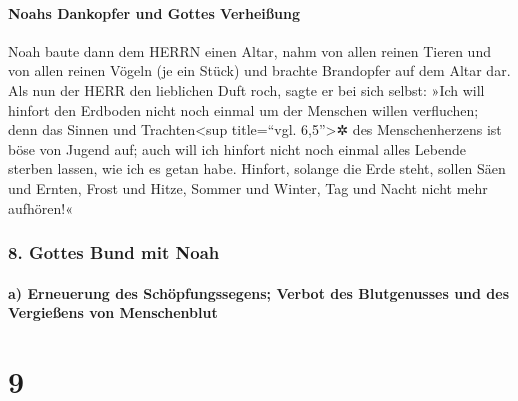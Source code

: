 \hypertarget{noahs-dankopfer-und-gottes-verheiuxdfung}{%
\paragraph{Noahs Dankopfer und Gottes
Verheißung}\label{noahs-dankopfer-und-gottes-verheiuxdfung}}

 Noah baute dann dem HERRN einen Altar, nahm von allen
reinen Tieren und von allen reinen Vögeln (je ein Stück) und brachte
Brandopfer auf dem Altar dar.  Als nun der HERR den
lieblichen Duft roch, sagte er bei sich selbst: »Ich will hinfort den
Erdboden nicht noch einmal um der Menschen willen verfluchen; denn das
Sinnen und Trachten\textless sup title=``vgl. 6,5''\textgreater✲ des
Menschenherzens ist böse von Jugend auf; auch will ich hinfort nicht
noch einmal alles Lebende sterben lassen, wie ich es getan habe.
 Hinfort, solange die Erde steht, sollen Säen und Ernten,
Frost und Hitze, Sommer und Winter, Tag und Nacht nicht mehr aufhören!«

\hypertarget{gottes-bund-mit-noah}{%
\subsubsection{8. Gottes Bund mit Noah}\label{gottes-bund-mit-noah}}

\hypertarget{a-erneuerung-des-schuxf6pfungssegens-verbot-des-blutgenusses-und-des-vergieuxdfens-von-menschenblut}{%
\paragraph{a) Erneuerung des Schöpfungssegens; Verbot des Blutgenusses
und des Vergießens von
Menschenblut}\label{a-erneuerung-des-schuxf6pfungssegens-verbot-des-blutgenusses-und-des-vergieuxdfens-von-menschenblut}}

\hypertarget{section-8}{%
\section{9}\label{section-8}}

